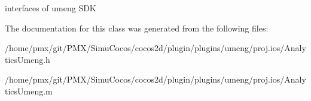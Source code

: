 interfaces of umeng S\+DK 

The documentation for this class was generated from the following files\+:\begin{DoxyCompactItemize}
\item 
/home/pmx/git/\+P\+M\+X/\+Simu\+Cocos/cocos2d/plugin/plugins/umeng/proj.\+ios/Analytics\+Umeng.\+h\item 
/home/pmx/git/\+P\+M\+X/\+Simu\+Cocos/cocos2d/plugin/plugins/umeng/proj.\+ios/Analytics\+Umeng.\+m\end{DoxyCompactItemize}
